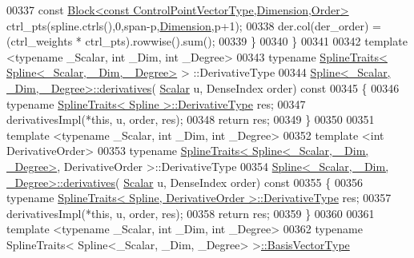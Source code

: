 \begin{DoxyCode}
00337       \textcolor{keyword}{const} \hyperlink{group___core___module_class_eigen_1_1_block}{Block<const ControlPointVectorType,Dimension,Order>}
       ctrl\_pts(spline.ctrls(),0,span-p,\hyperlink{group___splines___module_a82c233f1d4719bc52397d64a6c96c5b0a25366e5e79da5355d259a71096d8d8a7}{Dimension},p+1);
00338       der.col(der\_order) = (ctrl\_weights * ctrl\_pts).rowwise().sum();
00339     \}
00340   \}
00341 
00342   \textcolor{keyword}{template} <\textcolor{keyword}{typename} \_Scalar, \textcolor{keywordtype}{int} \_Dim, \textcolor{keywordtype}{int} \_Degree>
00343   \textcolor{keyword}{typename} \hyperlink{struct_eigen_1_1_spline_traits}{SplineTraits< Spline<\_Scalar, \_Dim, \_Degree>} >
      ::DerivativeType
00344     \hyperlink{group___splines___module_a196730cf190dfa16907db888277e5aed}{Spline<\_Scalar, \_Dim, \_Degree>::derivatives}(
      \hyperlink{group___splines___module_a8cafd78b564825c76fbb3419653d9742}{Scalar} u, DenseIndex order)\textcolor{keyword}{ const}
00345 \textcolor{keyword}{  }\{
00346     \textcolor{keyword}{typename} \hyperlink{struct_eigen_1_1_spline_traits}{SplineTraits< Spline >::DerivativeType} res;
00347     derivativesImpl(*\textcolor{keyword}{this}, u, order, res);
00348     \textcolor{keywordflow}{return} res;
00349   \}
00350 
00351   \textcolor{keyword}{template} <\textcolor{keyword}{typename} \_Scalar, \textcolor{keywordtype}{int} \_Dim, \textcolor{keywordtype}{int} \_Degree>
00352   \textcolor{keyword}{template} <\textcolor{keywordtype}{int} DerivativeOrder>
00353   \textcolor{keyword}{typename} \hyperlink{struct_eigen_1_1_spline_traits}{SplineTraits< Spline<\_Scalar, \_Dim, \_Degree>}, 
      DerivativeOrder >::DerivativeType
00354     \hyperlink{group___splines___module_a196730cf190dfa16907db888277e5aed}{Spline<\_Scalar, \_Dim, \_Degree>::derivatives}(
      \hyperlink{group___splines___module_a8cafd78b564825c76fbb3419653d9742}{Scalar} u, DenseIndex order)\textcolor{keyword}{ const}
00355 \textcolor{keyword}{  }\{
00356     \textcolor{keyword}{typename} \hyperlink{struct_eigen_1_1_spline_traits}{SplineTraits< Spline, DerivativeOrder >::DerivativeType}
       res;
00357     derivativesImpl(*\textcolor{keyword}{this}, u, order, res);
00358     \textcolor{keywordflow}{return} res;
00359   \}
00360 
00361   \textcolor{keyword}{template} <\textcolor{keyword}{typename} \_Scalar, \textcolor{keywordtype}{int} \_Dim, \textcolor{keywordtype}{int} \_Degree>
00362   \textcolor{keyword}{typename} SplineTraits< Spline<\_Scalar, \_Dim, \_Degree> >\hyperlink{group___splines___module_a1d49cef942ea59d85d1711ee32354e6b}{::BasisVectorType}

\end{DoxyCode}
